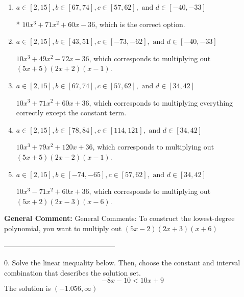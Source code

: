 \documentclass{extbook}[14pt]
\begin{document}
\begin{enumerate}[label=\Alph*.] 
\item $ a \in [2, 15], b \in [67, 74], c \in [57, 62], \text{ and } d \in [-40, -33] $ 

 * $10x^{3} +71 x^{2} +60 x -36$, which is the correct option. 
\item $ a \in [2, 15], b \in [43, 51], c \in [-73, -62], \text{ and } d \in [-40, -33] $ 

 $10x^{3} +49 x^{2} -72 x -36$, which corresponds to multiplying out $(5x + 5)(2x + 2)(x -1)$. 
\item $ a \in [2, 15], b \in [67, 74], c \in [57, 62], \text{ and } d \in [34, 42] $ 

 $10x^{3} +71 x^{2} +60 x + 36$, which corresponds to multiplying everything correctly except the constant term. 
\item $ a \in [2, 15], b \in [78, 84], c \in [114, 121], \text{ and } d \in [34, 42] $ 

 $10x^{3} +79 x^{2} +120 x + 36$, which corresponds to multiplying out $(5x + 5)(2x -2)(x -1)$. 
\item $ a \in [2, 15], b \in [-74, -65], c \in [57, 62], \text{ and } d \in [34, 42] $ 

 $10x^{3} -71 x^{2} +60 x + 36$, which corresponds to multiplying out $(5x + 2)(2x -3)(x -6)$. 
\end{enumerate} 
 
\textbf{General Comment:} General Comments: To construct the lowest-degree polynomial, you want to multiply out $(5x -2)(2x + 3)(x + 6)$ 

-----------------------------------------------

0. Solve the linear inequality below. Then, choose the constant and interval combination that describes the solution set.
\[ -8x -10 < 10x + 9 \] 
The solution is $ (-1.056, \infty) $ 
\end{document}
